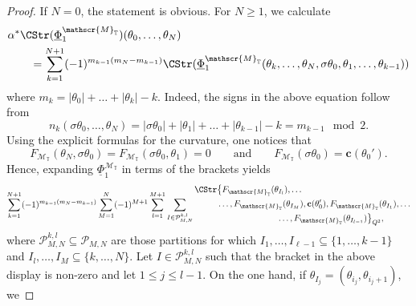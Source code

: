 \documentclass[a4paper, english, 12pt, bibliography=totocnumbered,
index=totoc]{scrartcl}
\begin{document}
\begin{proof}
	If $N = 0$, the statement is obvious.
	For $N \geq 1$, we calculate
	\begin{align*}
		& \alpha^*
		\CStr(\underline{\Phi}_1^{\mathscr{M}_{\mathbb{T}}})
		(\theta_0, \ldots, \theta_N) \\
		& \qquad = \sum_{k = 1}^{N+1} (-1)^{m_{k-1}(m_N - m_{k-1})}\CStr(
		\underline{\Phi}_1^{\mathscr{M}_{\mathbb{T}}}(\theta_k, \ldots,
		\theta_N, \sigma \theta_0, \theta_1, \ldots, \theta_{k-1}))
	\end{align*}
	where $m_k = \lvert \theta_0 \rvert + \ldots +
	\lvert \theta_k \rvert - k$.
	Indeed, the signs in the above equation follow from
	\begin{equation*}
		n_k(\sigma \theta_0, \ldots, \theta_N) = \lvert \sigma \theta_0 \rvert
		+ \lvert \theta_1 \rvert + \ldots + \lvert \theta_{k-1} \rvert - k =
		m_{k-1} \mod 2.
	\end{equation*}
	Using the explicit formulas for the curvature, one notices that
	\begin{equation*}
		F_{\mathscr{M}_{\mathbb{T}}}(\theta_N, \sigma\theta_0) =
		F_{\mathscr{M}_{\mathbb{T}}}(\sigma \theta_0, \theta_1) = 0
		\qquad \text{and} \qquad
		F_{\mathscr{M}_{\mathbb{T}}}(\sigma\theta_0) = \mathbf{c}(\theta_0').
	\end{equation*}
	Hence, expanding $\underline{\Phi}_1^{\mathscr{M}_{\mathbb{T}}}$ in
	terms of the brackets yields
	\begin{equation*}
		\sum_{k=1}^{N+1} (-1)^{m_{k-1}(m_N-m_{k-1})} \sum_{M=1}^N (-1)^{M+1}
		\sum_{l=1}^{M+1} \sum_{I \in \mathcal{P}_{M, N}^{k, l}}
		\begin{aligned}
			\CStr &\bigl\{F_{\mathscr{M}_{\mathbb{T}}}
			(\theta_{I_{l}}), \dots \\
			& \dots, F_{\mathscr{M}_{\mathbb{T}}}(\theta_{I_M}),
			\mathbf{c}(\theta_0^\prime),
			F_{\mathscr{M}_{\mathbb{T}}}(\theta_{I_1}), \dots \\
			&~~~~~~~~~~~~~~~~~~~~~\dots,
			F_{\mathscr{M}_{\mathbb{T}}}(\theta_{I_{l-1}})
			\bigr\}_{Q^2},
		\end{aligned}
	\end{equation*}
	where $\mathcal{P}^{k, l}_{M, N} \subseteq \mathcal{P}_{M, N}$ are those 
	partitions for which $I_1, \dots, I_{\ell-1} \subseteq \{1, \dots,
	k-1\}$ and $I_{l}, \dots, I_M \subseteq \{k, \dots, N\}$.
	Let $I \in \mathcal{P}^{k, l}_{M, N}$ such that the bracket in the above
	display is non-zero and let $1 \leq j \leq l-1$.
	On the one hand, if $\theta_{I_j} = (\theta_{i_j}, \theta_{i_{j}+1})$, we

\end{proof}
\end{document}
